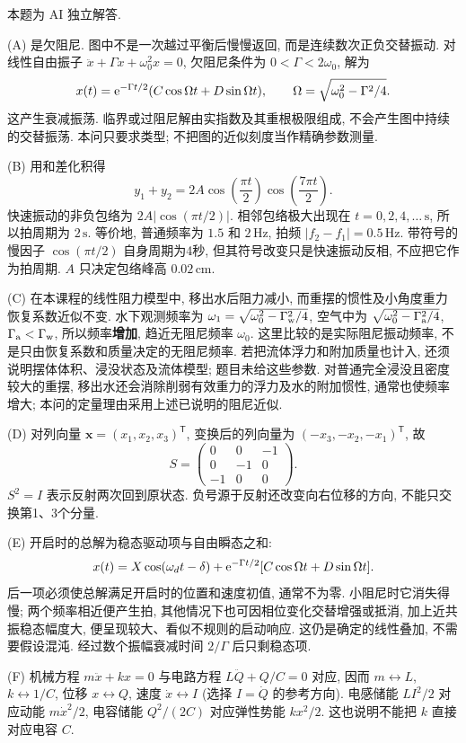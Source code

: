\begin{solution}
本题为 AI 独立解答.

(A) 是欠阻尼. 图中不是一次越过平衡后慢慢返回, 而是连续数次正负交替振动. 对线性自由振子 $\ddot x+\Gamma\dot x+\omega_0^2x=0$, 欠阻尼条件为 $0<\Gamma<2\omega_0$, 解为
\[
x(t)=\mathrm e^{-\Gamma t/2}(C\cos\Omega t+D\sin\Omega t),\qquad
\Omega=\sqrt{\omega_0^2-\Gamma^2/4}.
\]
这产生衰减振荡. 临界或过阻尼解由实指数及其重根极限组成, 不会产生图中持续的交替振荡. 本问只要求类型; 不把图的近似刻度当作精确参数测量.

(B) 用和差化积得
\[
y_1+y_2=2A\cos\!\left(\frac{\pi t}{2}\right)\cos\!\left(\frac{7\pi t}{2}\right).
\]
快速振动的非负包络为 $2A|\cos(\pi t/2)|$. 相邻包络极大出现在 $t=0,2,4,\ldots\,\mathrm s$, 所以拍周期为 $2\,\mathrm s$. 等价地, 普通频率为 $1.5$ 和 $2\,\mathrm{Hz}$, 拍频 $|f_2-f_1|=0.5\,\mathrm{Hz}$. 带符号的慢因子 $\cos(\pi t/2)$ 自身周期为4秒, 但其符号改变只是快速振动反相, 不应把它作为拍周期. $A$ 只决定包络峰高 $0.02\,\mathrm{cm}$.

(C) 在本课程的线性阻力模型中, 移出水后阻力减小, 而重摆的惯性及小角度重力恢复系数近似不变. 水下观测频率为 $\omega_1=\sqrt{\omega_0^2-\Gamma_{\rm w}^2/4}$, 空气中为 $\sqrt{\omega_0^2-\Gamma_{\rm a}^2/4}$, $\Gamma_{\rm a}<\Gamma_{\rm w}$, 所以频率\textbf{增加}, 趋近无阻尼频率 $\omega_0$. 这里比较的是实际阻尼振动频率, 不是只由恢复系数和质量决定的无阻尼频率. 若把流体浮力和附加质量也计入, 还须说明摆体体积、浸没状态及流体模型; 题目未给这些参数. 对普通完全浸没且密度较大的重摆, 移出水还会消除削弱有效重力的浮力及水的附加惯性, 通常也使频率增大; 本问的定量理由采用上述已说明的阻尼近似.

(D) 对列向量 $\boldsymbol x=(x_1,x_2,x_3)^{\mathsf T}$, 变换后的列向量为 $(-x_3,-x_2,-x_1)^{\mathsf T}$, 故
\[
S=\begin{pmatrix}0&0&-1\\0&-1&0\\-1&0&0\end{pmatrix}.
\]
$S^2=I$ 表示反射两次回到原状态. 负号源于反射还改变向右位移的方向, 不能只交换第1、3个分量.

(E) 开启时的总解为稳态驱动项与自由瞬态之和:
\[
x(t)=X\cos(\omega_dt-\delta)+\mathrm e^{-\Gamma t/2}[C\cos\Omega t+D\sin\Omega t].
\]
后一项必须使总解满足开启时的位置和速度初值, 通常不为零. 小阻尼时它消失得慢; 两个频率相近便产生拍, 其他情况下也可因相位变化交替增强或抵消, 加上近共振稳态幅度大, 便呈现较大、看似不规则的启动响应. 这仍是确定的线性叠加, 不需要假设混沌. 经过数个振幅衰减时间 $2/\Gamma$ 后只剩稳态项.

(F) 机械方程 $m\ddot x+kx=0$ 与电路方程 $L\ddot Q+Q/C=0$ 对应, 因而 $m\leftrightarrow L$, $k\leftrightarrow1/C$, 位移 $x\leftrightarrow Q$, 速度 $\dot x\leftrightarrow I$ (选择 $I=\dot Q$ 的参考方向). 电感储能 $LI^2/2$ 对应动能 $m\dot x^2/2$, 电容储能 $Q^2/(2C)$ 对应弹性势能 $kx^2/2$. 这也说明不能把 $k$ 直接对应电容 $C$.
\end{solution}

